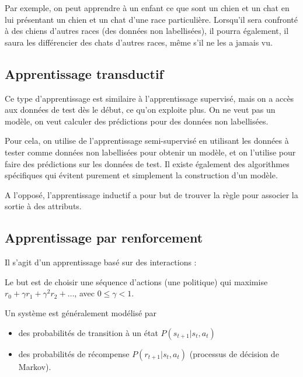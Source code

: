 			Par exemple, on peut apprendre à un enfant ce que sont un chien et un chat en lui présentant un chien et un chat d'une race particulière. Lorsqu'il sera confronté à des chiens d'autres races (des données non labellisées), il pourra également, il saura les différencier des chats d'autres races, même s'il ne les a jamais vu.
		
		\subsection{Apprentissage transductif}
		
		Ce type d'apprentissage est similaire à l'apprentissage supervisé, mais on a accès aux données de test dès le début, ce qu'on exploite plus. On ne veut pas un modèle, on veut calculer des prédictions pour des données non labellisées.
		
		Pour cela, on utilise de l'apprentissage semi-supervisé en utilisant les données à tester comme données non labellisées  pour obtenir un modèle, et on l'utilise pour faire des prédictions sur les données de test. Il existe également des algorithmes spécifiques qui évitent purement et simplement la construction d'un modèle.
		
		A l'opposé, l'apprentissage inductif a pour but de trouver la règle pour associer la sortie à des attributs.
		
		\subsection{Apprentissage par renforcement}
		
		Il s'agit d'un apprentissage basé sur des interactions :
		
		
		Le but est de choisir une séquence d'actions (une politique) qui maximise $r_0 + \gamma r_1 + \gamma^2 r_2 + \dots$, avec $0 \leq \gamma < 1$.
		
		
		Un système est généralement modélisé par
		
		\begin{itemize}
			\item des probabilités de transition à un état $P(s_{t + 1} \vert s_t, a_t)$
			\item des probabilités de récompense $P(r_{t + 1} \vert s_t, a_t)$ 		(processus de décision de Markov).
		\end{itemize}
		
